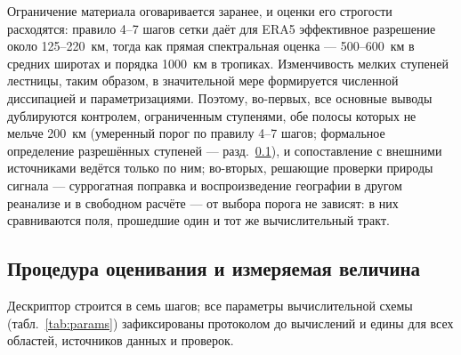 \documentclass[11pt,a4paper]{article}
\begin{document}
Ограничение материала оговаривается заранее, и оценки его строгости расходятся: правило 4--7 шагов сетки \cite{Skamarock2004} даёт для ERA5 эффективное разрешение около 125--220~км, тогда как прямая спектральная оценка \cite{Bolgiani2022} --- 500--600~км в средних широтах и порядка 1000~км в тропиках. Изменчивость мелких ступеней лестницы, таким образом, в значительной мере формируется численной диссипацией и параметризациями. Поэтому, во-первых, все основные выводы дублируются контролем, ограниченным ступенями, обе полосы которых не мельче 200~км (умеренный порог по правилу 4--7 шагов; формальное определение разрешённых ступеней --- разд.~\ref{sec:estimator}), и сопоставление с внешними источниками ведётся только по ним; во-вторых, решающие проверки природы сигнала --- суррогатная поправка и воспроизведение географии в другом реанализе и в свободном расчёте --- от выбора порога не зависят: в них сравниваются поля, прошедшие один и тот же вычислительный тракт.

\subsection{Процедура оценивания и измеряемая величина}
\label{sec:estimator}

Дескриптор строится в семь шагов; все параметры вычислительной схемы (табл.~\ref{tab:params}) зафиксированы протоколом до вычислений и едины для всех областей, источников данных и проверок.
\end{document}
